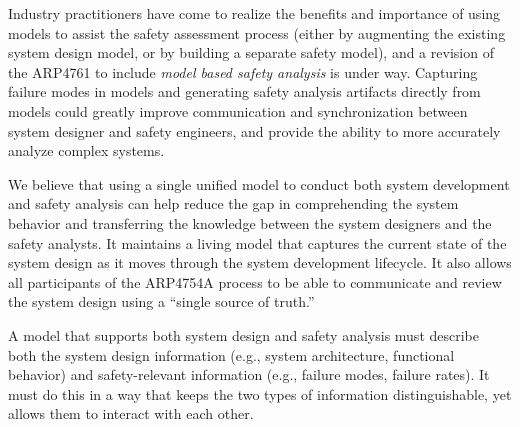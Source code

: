 


Industry practitioners have come to realize the benefits and importance of
using models to assist the safety assessment process (either by augmenting the existing system design model, or by building a separate safety model), and a revision of the ARP4761 to include {\em model based safety analysis} is under way.
Capturing failure modes in models and generating safety analysis artifacts directly from models could greatly improve communication and synchronization between system designer and safety engineers, and provide the ability to more accurately analyze complex systems. 

We believe that using a single unified model to conduct both system development and safety analysis can help reduce the gap in comprehending the system behavior and transferring the knowledge between the system designers and the safety analysts. It maintains a living model that captures the current state of the system design as it moves through the system development lifecycle. It also allows all participants of the ARP4754A process to be able to communicate and review the system design using a ``single source of truth.''

A model that supports both system design and safety analysis must describe both the system design information (e.g., system architecture, functional behavior) and safety-relevant information (e.g., failure modes, failure rates).  It must do this in a way that keeps the two types of information distinguishable, yet allows them to interact with each other.

